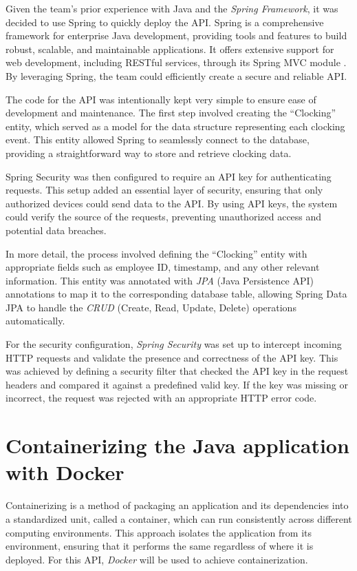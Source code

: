 Given the team's prior experience with Java and the \textit{Spring Framework}, it was decided to 
use Spring to quickly deploy the API. Spring is a comprehensive framework for enterprise Java 
development, providing tools and features to build robust, scalable, and maintainable 
applications. It offers extensive support for web development, including RESTful services, through 
its Spring MVC module \cite{spring_docs}. By leveraging Spring, the team could efficiently create 
a secure and reliable API.

The code for the API was intentionally kept very simple to ensure ease of development and 
maintenance. The first step involved creating the ``Clocking'' entity, which served as a model for 
the data structure representing each clocking event. This entity allowed Spring to seamlessly 
connect to the database, providing a straightforward way to store and retrieve clocking data.

Spring Security was then configured to require an API key for authenticating requests. This setup 
added an essential layer of security, ensuring that only authorized devices could send data to 
the API. By using API keys, the system could verify the source of the requests, preventing 
unauthorized access and potential data breaches.

In more detail, the process involved defining the ``Clocking'' entity with appropriate fields such 
as employee ID, timestamp, and any other relevant information. This entity was annotated with 
\textit{JPA} (Java Persistence API) annotations to map it to the corresponding database table, 
allowing Spring Data JPA to handle the \textit{CRUD} (Create, Read, Update, Delete) operations 
automatically.

For the security configuration, \textit{Spring Security} was set up to intercept incoming HTTP 
requests and validate the presence and correctness of the API key. This was achieved by defining a 
security filter that checked the API key in the request headers and compared it against a 
predefined valid key. If the key was missing or incorrect, the request was rejected with an 
appropriate HTTP error code.


\section{Containerizing the Java application with Docker}

Containerizing is a method of packaging an application and its dependencies into a standardized 
unit, called a container, which can run consistently across different computing environments. 
This approach isolates the application from its environment, ensuring that it performs the same 
regardless of where it is deployed. For this API, \textit{Docker} will be used to achieve 
containerization.

